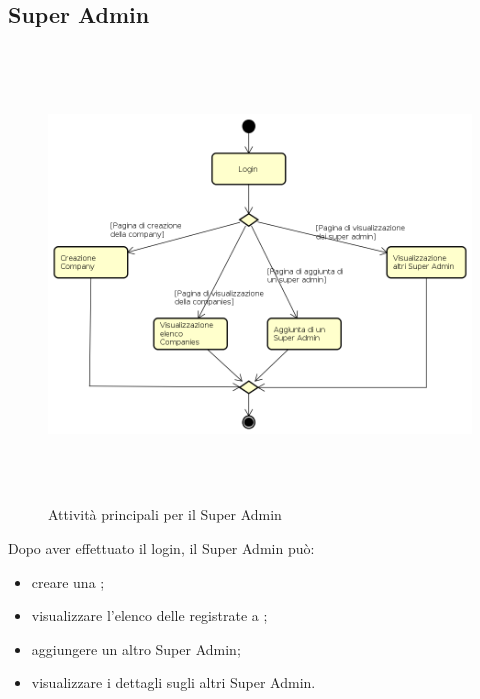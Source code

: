\subsection{Super Admin}
\begin{figure}[H]
\begin{center}
\includegraphics[height=12cm]{res/sections/backend/activities/principaliSuperAdmin.png}
\caption{Attività principali per il Super Admin}
\end{center}
\end{figure}
Dopo aver effettuato il login, il Super Admin può:
\begin{itemize}
\item creare una ;
\item visualizzare l'elenco delle  registrate a ;
\item aggiungere un altro Super Admin;
\item visualizzare i dettagli sugli altri Super Admin.
\end{itemize}
